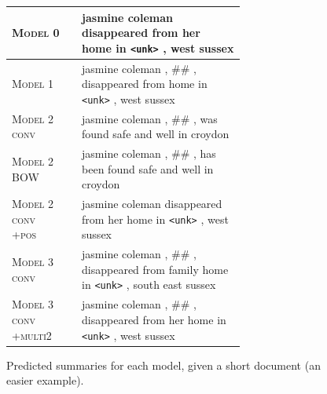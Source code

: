 \documentclass[12pt]{report}
\begin{document}
\begin{figure}[p]
\begin{tabular}{ll p{0.7\linewidth}}
\textsc{Model 0} & & jasmine coleman disappeared from her home in \texttt{<unk>} , west sussex \\
\midrule
 \textsc{Model 1} & & jasmine coleman , \#\# , disappeared from home in \texttt{<unk>} , west sussex \\
\midrule
\textsc{Model 2 conv} & & jasmine coleman , \#\# , was found safe and well in croydon \\
\textsc{Model 2 BOW} & & jasmine coleman , \#\# , has been found safe and well in croydon \\
\textsc{Model 2 conv +pos} & & jasmine coleman disappeared from her home in \texttt{<unk>} , west sussex \\
\midrule
\textsc{Model 3 conv} & & jasmine coleman , \#\# , disappeared from family home in \texttt{<unk>} , south east sussex \\
\textsc{Model 3 conv +multi2} & & jasmine coleman , \#\# , disappeared from her home in \texttt{<unk>} , west sussex \\
\bottomrule
\end{tabular}
\caption{Predicted summaries for each model, given a short document (an easier example).}
\label{fig:predicted_summaries1}
\end{figure}
\end{document}
